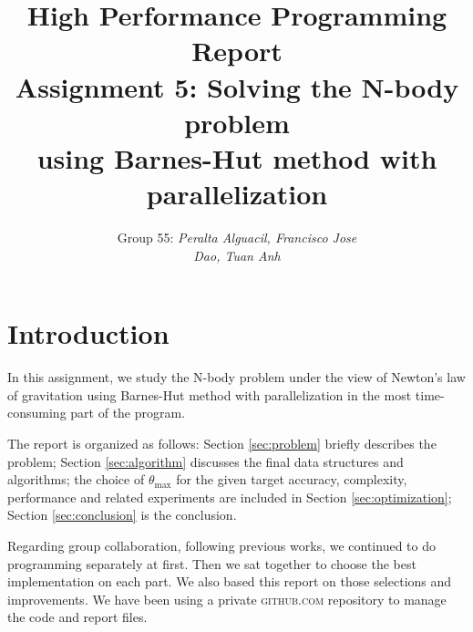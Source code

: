 \documentclass[12pt,oneside,a4paper]{article}
\begin{document}
	\title{High Performance Programming Report\\[0.5cm]
		\large{Assignment 5: Solving the N-body problem\\using Barnes-Hut method with parallelization}
	}
	\author{Group 55: \hspace{1cm} \textit{Peralta Alguacil, Francisco Jose}\\ \textit{Dao, Tuan Anh}}
	\maketitle
	\pagestyle{fancy}

\section{Introduction}
\label{sec:intro}
In this assignment, we study the N-body problem under the view of Newton's law of gravitation using Barnes-Hut method with parallelization in the most time-consuming part of the program.

The report is organized as follows: Section \ref{sec:problem} briefly describes the problem; Section \ref{sec:algorithm} discusses the final data structures and algorithms; the choice of $\theta_{\max}$ for the given target accuracy, complexity, performance and related experiments are included in Section \ref{sec:optimization}; Section \ref{sec:conclusion} is the conclusion.

Regarding group collaboration, following previous works, we continued to do programming separately at first. Then we sat together to choose the best implementation on each part. We also based this report on those selections and improvements. We have been using a private \textsc{github.com} repository to manage the code and report files.

\begin{table}[h]
\centering
\caption{CPUs used for performance testing in this report}
\label{tab:cpus}
\hspace*{-1.2cm}
\end{table}
\end{document}
